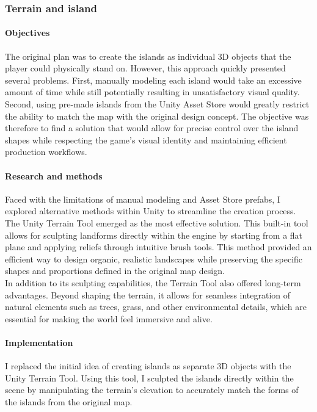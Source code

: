 \documentclass{article}
\begin{document}
\subsubsection{Terrain and island}
\paragraph{Objectives}\hfill

The original plan was to create the islands as individual 3D objects that the player could physically stand on. However, this approach quickly presented several problems. First, manually modeling each island would take an excessive amount of time while still potentially resulting in unsatisfactory visual quality. Second, using pre-made islands from the Unity Asset Store would greatly restrict the ability to match the map with the original design concept. The objective was therefore to find a solution that would allow for precise control over the island shapes while respecting the game's visual identity and maintaining efficient production workflows.

\paragraph{Research and methods}\hfill

Faced with the limitations of manual modeling and Asset Store prefabs, I explored alternative methods within Unity to streamline the creation process. The Unity Terrain Tool emerged as the most effective solution. This built-in tool allows for sculpting landforms directly within the engine by starting from a flat plane and applying reliefs through intuitive brush tools. This method provided an efficient way to design organic, realistic landscapes while preserving the specific shapes and proportions defined in the original map design.\\

In addition to its sculpting capabilities, the Terrain Tool also offered long-term advantages. Beyond shaping the terrain, it allows for seamless integration of natural elements such as trees, grass, and other environmental details, which are essential for making the world feel immersive and alive.

\paragraph{Implementation}\hfill

I replaced the initial idea of creating islands as separate 3D objects with the Unity Terrain Tool. Using this tool, I sculpted the islands directly within the scene by manipulating the terrain's elevation to accurately match the forms of the islands from the original map. 
\end{document}
